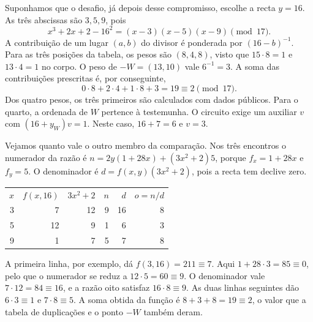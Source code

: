 Suponhamos que o desafio, já depois desse compromisso, escolhe a
recta \(y=16\). As três abscissas são \(3,5,9\), pois
\[
 x^3+2x+2-16^2=(x-3)(x-5)(x-9)\pmod {17}.
\]
A contribuição de um lugar \((a,b)\) do divisor é ponderada por
\((16-b)^{-1}\). Para as três posições da tabela, os pesos são
\((8,4,8)\), visto que \(15\cdot8=1\) e \(13\cdot4=1\) no corpo.
O peso de \(-W=(13,10)\) vale \(6^{-1}=3\). A soma das contribuições
prescritas é, por conseguinte,
\[
 0\cdot8+2\cdot4+1\cdot8+3=19\equiv2\pmod {17}.
\]
Dos quatro pesos, os três primeiros são calculados com dados
públicos. Para o quarto, a ordenada de \(W\) pertence à
testemunha. O circuito exige um auxiliar \(v\) com
\((16+y_W)v=1\). Neste caso, \(16+7=6\) e \(v=3\).

Vejamos quanto vale o outro membro da comparação. Nos três encontros
o numerador da razão é
\(n=2y(1+28x)+(3x^2+2)5\), porque
\(f_x=1+28x\) e \(f_y=5\). O denominador é
\(d=f(x,y)(3x^2+2)\), pois a recta tem declive zero.
\begin{center}
\begin{tabular}{rrrrrr}
 \(x\) & \(f(x,16)\) & \(3x^2+2\) & \(n\) & \(d\) & \(o=n/d\)\\[1mm]
 3 & 7  &12 &9 &16 &8\\
 5 & 12 & 9 &1 & 6 &3\\
 9 & 1  & 7 &5 & 7 &8
\end{tabular}
\end{center}
A primeira linha, por exemplo, dá \(f(3,16)=211\equiv7\).
Aqui \(1+28\cdot3=85\equiv0\), pelo que o numerador se reduz a
\(12\cdot5=60\equiv9\). O denominador vale \(7\cdot12=84\equiv16\),
e a razão oito satisfaz \(16\cdot8\equiv9\). As duas linhas
seguintes dão \(6\cdot3\equiv1\) e \(7\cdot8\equiv5\).
A soma obtida da função é \(8+3+8=19\equiv2\), o valor que a
tabela de duplicações e o ponto \(-W\) também deram.

